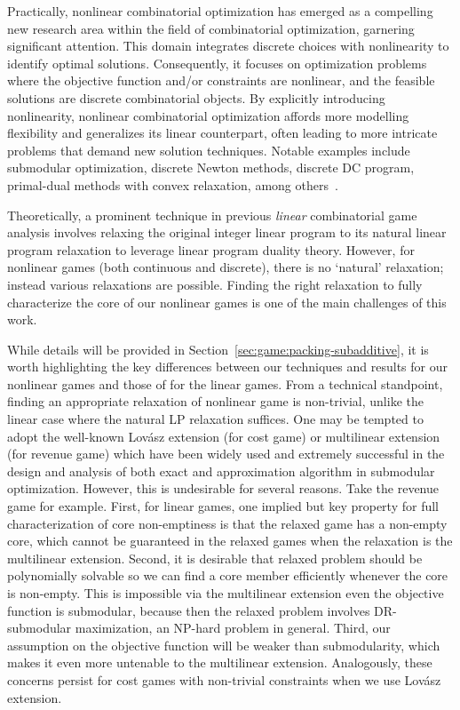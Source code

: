 \documentclass[11pt]{article}\usepackage[]{graphicx}\usepackage[]{xcolor}
\begin{document}
Practically, nonlinear combinatorial optimization has emerged as a compelling new research area within the field of combinatorial optimization, garnering significant attention. This domain integrates discrete choices with nonlinearity to identify optimal solutions. Consequently, it focuses on optimization problems where the objective function and/or constraints are nonlinear, and the feasible solutions are discrete combinatorial objects. By explicitly introducing nonlinearity, nonlinear combinatorial optimization affords more modelling flexibility and generalizes its linear counterpart, often leading to more intricate problems that demand new solution techniques. Notable examples include submodular optimization, discrete Newton methods, discrete DC program, primal-dual methods with convex relaxation, among others~\citep{murota2003discrete,li2006nonlinear,du2019nonlinear,belotti2013mixed}.
 
Theoretically, a prominent technique in previous \emph{linear} combinatorial game analysis involves relaxing the original integer linear program to its natural linear program relaxation to leverage linear program duality theory. However, for nonlinear games (both continuous and discrete), there is no `natural' relaxation; instead various relaxations are possible. Finding the right relaxation to fully characterize the core of our nonlinear games is one of the main challenges of this work.

While details will be provided in Section~\ref{sec:game:packing-subadditive}, it is worth highlighting the key differences between our techniques and results for our nonlinear games and those of \citep{samet1984core,deng1999algorithmic,faigle2000core,deng2000totally} for the linear games. From a technical standpoint, finding an appropriate relaxation of nonlinear game is non-trivial, unlike the linear case where the natural LP relaxation suffices. One may be tempted to adopt the well-known Lov\'{a}sz extension (for cost game) or multilinear extension (for revenue game) which have been widely used and extremely successful in the design and analysis of both exact and approximation algorithm in submodular optimization. However, this is undesirable for several reasons. Take the revenue game for example. First, for linear games, one implied but key property for full characterization of core non-emptiness is that the relaxed game has a non-empty core, which cannot be guaranteed in the relaxed games when the relaxation is the multilinear extension. Second, it is desirable that relaxed problem should be polynomially solvable so we can find a core member efficiently whenever the core is non-empty. This is impossible via the multilinear extension even the objective function is submodular, because then the relaxed problem involves DR-submodular maximization, an NP-hard problem in general. Third, our assumption on the objective function will be weaker than submodularity, which makes it even more untenable to the multilinear extension. Analogously, these concerns persist for cost games with non-trivial constraints when we use Lov\'{a}sz extension. 
\end{document}
